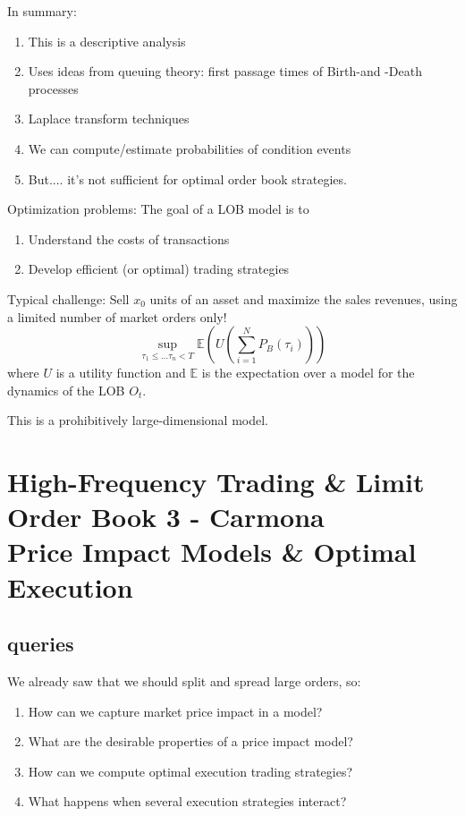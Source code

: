 In summary:
\begin{enumerate}
	\item This is a descriptive analysis
	\item Uses ideas from queuing theory: first passage times of Birth-and -Death processes
	\item Laplace transform techniques
	\item We can compute/estimate probabilities of condition events
	\item But.... it's not sufficient for optimal order book strategies.
\end{enumerate}

Optimization problems: The goal of a LOB model is to
\begin{enumerate}
	\item Understand the costs of transactions
	\item Develop efficient (or optimal) trading strategies
\end{enumerate}

Typical challenge: Sell $x_0$ units of an asset and maximize the sales revenues, using a limited number of market orders only!
\begin{equation}
	\sup_{\tau_1 \leq ... \tau_n < T} \mathbb{E}(U(\sum_{i=1}^N P_B(\tau_i)))
\end{equation}
where $U$ is a utility function and $\mathbb{E}$ is the expectation over a model for the dynamics of the LOB $O_t$.

This is a prohibitively large-dimensional model.

\chapter{High-Frequency Trading \& Limit Order Book 3 - Carmona\\ Price Impact Models \& Optimal Execution}
\section{queries}
We already saw that we should split and spread large orders, so:
\begin{enumerate}
	\item How can we capture market price impact in a model?
	\item What are the desirable properties of a price impact model?
	\item How can we compute optimal execution trading strategies?
	\item What happens when several execution strategies interact?
\end{enumerate}

